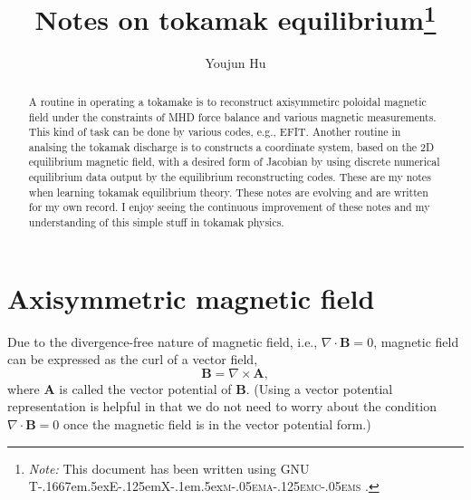 \documentclass{llncs}
\newcommand{\TeXmacs}{T\kern-.1667em\lower.5ex\hbox{E}\kern-.125emX\kern-.1em\lower.5ex\hbox{\textsc{m\kern-.05ema\kern-.125emc\kern-.05ems}}}
\newcommand{\citetexmacs}[1]{This document has been written using GNU {\TeXmacs} \cite{#1}.}
\newcommand{\tmnote}[1]{\thanks{\textit{Note:} #1}}
\begin{document}
\title{Notes on tokamak equilibrium\tmnote{{\citetexmacs{TeXmacs:website}}}}

\author{Youjun Hu}


\maketitle

\begin{abstract}
  A routine in operating a tokamake is to reconstruct axisymmetirc poloidal
  magnetic field under the constraints of MHD force balance and various
  magnetic measurements. This kind of task can be done by various codes, e.g.,
  EFIT. Another routine in analsing the tokamak discharge is to constructs a
  coordinate system, based on the 2D equilibrium magnetic field, with a
  desired form of Jacobian by using discrete numerical equilibrium data output
  by the equilibrium reconstructing codes. These are my notes when learning
  tokamak equilibrium theory. These notes are evolving and are written for my own record.
  I enjoy seeing the continuous improvement of these notes and my understanding of this simple stuff in tokamak physics.
\end{abstract}

\section{ Axisymmetric magnetic field}\label{5-13-1s}

Due to the divergence-free nature of magnetic field, i.e., $\nabla \cdot
\mathbf{B}= 0$, magnetic field can be expressed as the curl of a vector field,
\begin{equation}
  \mathbf{B}= \nabla \times \mathbf{A},
\end{equation}
where $\mathbf{A}$ is called the vector potential of $\mathbf{B}$. (Using a
vector potential representation is helpful in that we do not need to worry
about the condition $\nabla \cdot \mathbf{B}= 0$ once the magnetic field is in
the vector potential form.)
\end{document}
